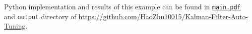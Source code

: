 Python implementation and results of this example can be found in \href{https://github.com/HaoZhu10015/Kalman-Filter-Auto-Tuning/blob/main/main.py}{\texttt{main.pdf}} and \texttt{output} directory of \href{https://github.com/HaoZhu10015/Kalman-Filter-Auto-Tuning}{https://github.com/HaoZhu10015/Kalman-Filter-Auto-Tuning}.